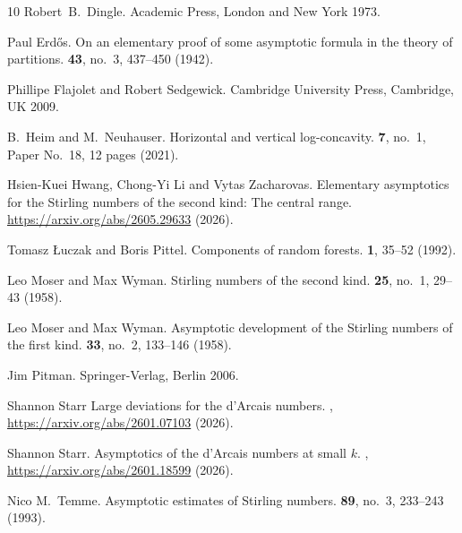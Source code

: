 \documentclass[12pt]{article}
\begin{document}
\begin{thebibliography}{10}
Robert~B.~Dingle.
\newblock Academic Press, London and New York 1973.

Paul Erd\H{o}s.
\newblock On an elementary proof of some asymptotic formula in the theory of partitions.
 {\bf 43}, no.~3, 437--450 (1942).

Phillipe Flajolet and Robert Sedgewick.
Cambridge University Press, Cambridge, UK 2009.


B.~Heim and M.~Neuhauser.
\newblock Horizontal and vertical log-concavity.
 {\bf 7}, no.~1, Paper No.~18, 12 pages (2021).

Hsien-Kuei Hwang, Chong-Yi Li and Vytas Zacharovas.
\newblock Elementary asymptotics for the Stirling numbers of the second kind: The central range.
 \url{https://arxiv.org/abs/2605.29633} (2026).

Tomasz {\L}uczak and Boris Pittel.
\newblock Components of random forests.
 {\bf 1}, 35--52 (1992).

Leo Moser and Max Wyman.
\newblock Stirling numbers of the second kind.
 {\bf 25}, no.~1, 29--43 (1958).

Leo Moser and Max Wyman.
\newblock Asymptotic development of the Stirling numbers of the first kind.
 {\bf 33}, no.~2, 133--146 (1958).

Jim Pitman.
\newblock Springer-Verlag, Berlin 2006.

Shannon Starr
\newblock Large deviations for the d'Arcais numbers.
, \url{https://arxiv.org/abs/2601.07103} (2026).

Shannon Starr.
\newblock Asymptotics of the d'Arcais numbers at small $k$.
, \url{https://arxiv.org/abs/2601.18599} (2026).

Nico M.~Temme.
\newblock Asymptotic estimates of Stirling numbers.
 {\bf 89}, no.~3, 233--243 (1993).

\end{thebibliography}
\end{document}
